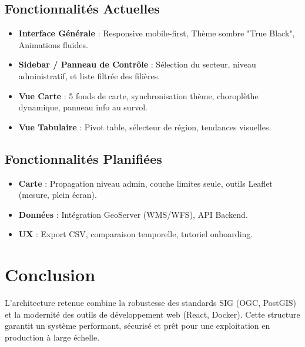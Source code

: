 \documentclass[11pt,a4paper]{article}
\begin{document}
\subsection{Fonctionnalités Actuelles}
\begin{itemize}
    \item \textbf{Interface Générale} : Responsive mobile-first, Thème sombre "True Black", Animations fluides.
    \item \textbf{Sidebar / Panneau de Contrôle} : Sélection du secteur, niveau administratif, et liste filtrée des filières.
    \item \textbf{Vue Carte} : 5 fonds de carte, synchronisation thème, choroplèthe dynamique, panneau info au survol.
    \item \textbf{Vue Tabulaire} : Pivot table, sélecteur de région, tendances visuelles.
\end{itemize}

\subsection{Fonctionnalités Planifiées}
\begin{itemize}
    \item \textbf{Carte} : Propagation niveau admin, couche limites seule, outils Leaflet (mesure, plein écran).
    \item \textbf{Données} : Intégration GeoServer (WMS/WFS), API Backend.
    \item \textbf{UX} : Export CSV, comparaison temporelle, tutoriel onboarding.
\end{itemize}



\section{Conclusion}
L'architecture retenue combine la robustesse des standards SIG (OGC, PostGIS) et la modernité des outils de développement web (React, Docker). Cette structure garantit un système performant, sécurisé et prêt pour une exploitation en production à large échelle.
\end{document}
